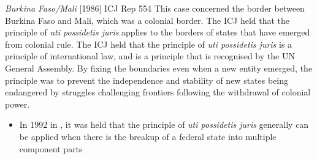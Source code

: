 \begin{casedetails}{\textit{Burkina Faso/Mali} [1986] ICJ Rep 554}
    \flushleft
    This case concerned the border between Burkina Faso and Mali, which was a colonial border. The ICJ held that the principle of \textit{uti possidetis juris} applies to the borders of states that have emerged from colonial rule. The ICJ held that the principle of \textit{uti possidetis juris} is a principle of international law, and is a principle that is recognised by the UN General Assembly. By fixing the boundaries even when a new entity emerged, the principle was to prevent the independence and stability of new states being endangered by struggles challenging frontiers following the withdrawal of colonial power.
\end{casedetails}

\begin{itemize}
    \item In 1992 in , it was held that the principle of \textit{uti possidetis juris} generally can be applied when there is the breakup of a federal state into multiple component parts
\end{itemize}

